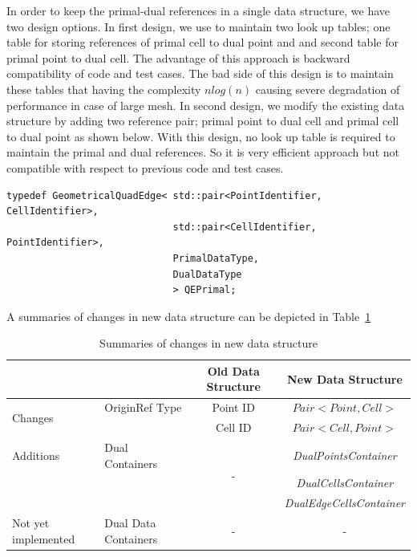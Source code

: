 \documentclass{InsightArticle}
\begin{document}
In order to keep the primal-dual references in a single data structure, we have two design options. In first design, we use to maintain two look up tables; one table for storing references of primal cell to dual point and and second table for primal point to dual cell. The advantage of this approach is backward compatibility of code and test cases. The bad side of this design is to maintain these tables that having the complexity $nlog(n)$ causing severe degradation of performance in case of large mesh. In second design, we modify the existing data structure by adding two reference pair; primal point to dual cell and primal cell to dual point as shown below. With this design, no look up table is required to maintain the primal and dual references. So it is very efficient approach but not compatible with respect to previous code and test cases. 

\begin{verbatim}
typedef GeometricalQuadEdge< std::pair<PointIdentifier, CellIdentifier>,
                             std::pair<CellIdentifier,  PointIdentifier>,
                             PrimalDataType, 
                             DualDataType
                             > QEPrimal;
\end{verbatim}
A summaries of changes in new data structure can be depicted in Table~\ref{table:secondDesign}
\begin{table}
	\begin{center}
		\caption{Summaries of changes in new data structure}
		\label{table:secondDesign}
		\begin{tabular}{ l|l|c|c }
			\hline	
			{\bf  }	& {\bf } 	& {\bf Old Data Structure}	& {\bf New Data Structure}\\
			\hline  	
			\multirow{2}{*}{\vspace{0.5cm}Changes}  & OriginRef Type & Point ID & $Pair<Point, Cell>$ \\
			  &  &  Cell ID & $Pair<Cell, Point>$ \\ 
			Additions & Dual Containers & \multirow{3}{*}{-} & \emph{DualPointsContainer} \\ 
			  &  &  & \emph{DualCellsContainer} \\ 
			  &  &  & \emph{DualEdgeCellsContainer}\\
			Not yet implemented & Dual Data Containers &  - &  -  \\
			\hline
	\end{tabular}
	\end{center}
\end{table}
\end{document}
